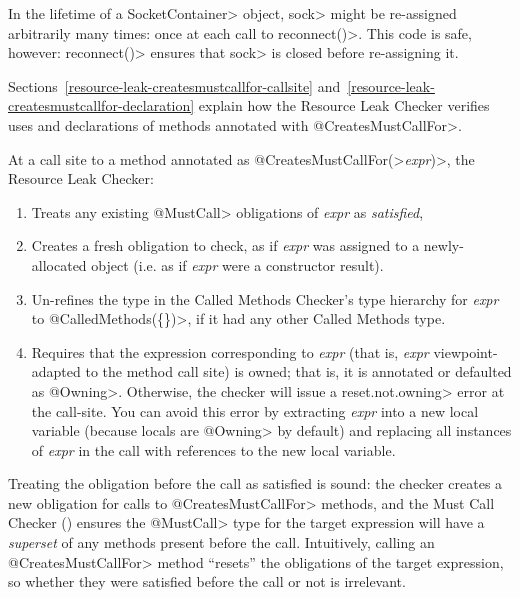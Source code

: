 In the lifetime of a \<SocketContainer> object, \<sock>
might be re-assigned arbitrarily many times: once at each
call to \<reconnect()>. This code is safe, however: \<reconnect()>
ensures that \<sock> is closed before re-assigning it.

Sections~\ref{resource-leak-createsmustcallfor-callsite}
and~\ref{resource-leak-createsmustcallfor-declaration}
explain how the Resource Leak Checker verifies uses and declarations of
methods annotated with \<@CreatesMustCallFor>.



At a call site to a method annotated as
\<@CreatesMustCallFor(>\emph{expr}\<)>, the Resource Leak Checker:
\begin{enumerate}
\item
  Treats any existing \<@MustCall> obligations of \emph{expr} as \emph{satisfied},
\item
  Creates a fresh obligation to check, as if \emph{expr} was assigned to a newly-allocated
  object (i.e. as if \emph{expr} were a constructor result).
\item
  Un-refines the type in the Called Methods Checker's type hierarchy for \emph{expr} to
  \<@CalledMethods(\{\})>, if it had any other Called Methods type.
\item
  Requires that the expression corresponding to \emph{expr} (that is, \emph{expr}
  viewpoint-adapted to the method call site) is owned; that is, it is
  annotated or defaulted as \<@Owning>.  Otherwise, the checker
  will issue a \<reset.not.owning> error at the call-site. You can avoid this
  error by extracting \emph{expr} into a new local variable (because
  locals are \<@Owning> by default) and replacing all instances of \emph{expr}
  in the call with references to the new local variable.
\end{enumerate}

Treating the obligation before the call as satisfied is sound: the
checker creates a new obligation for calls to \<@CreatesMustCallFor> methods,
and the Must Call Checker () ensures the
\<@MustCall> type for the target expression will have a \emph{superset} of any methods
present before the call. Intuitively, calling an \<@CreatesMustCallFor> method
``resets'' the obligations of the target expression, so whether they were satisfied before
the call or not is irrelevant.

